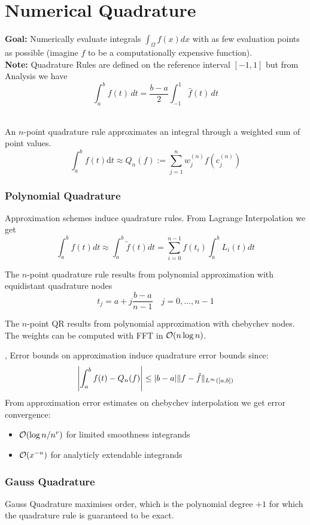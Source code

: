 \columnbreak
\part{Numerical Quadrature}
\setcounter{section}{0}

\textbf{Goal:} Numerically evaluate integrals $\int_{\Omega} f(x) dx$ with as few evaluation points as possible (imagine $f$ to be a computationally expensive function).\\

\textbf{Note:} Quadrature Rules are defined on the reference interval $[-1,1]$ but from Analysis we have
$$\int_a^b f(t) \,dt = \frac{b-a}{2} \int_{-1}^1 \hat{f}(t) \,dt$$

\\
An $n$-point quadrature rule approximates an integral through a weighted sum of point values.
$$\int_{a}^{b} f(t) \mathrm{d} t \approx Q_{n}(f):=\sum_{j=1}^{n} w_{j}^{(n)} f(c_{j}^{(n)})$$

\section{Polynomial Quadrature}

Approximation schemes induce quadrature rules. From Lagrange Interpolation we get
$$\int_{a}^{b} f(t) dt \approx  \int_{a}^{b} \tilde{f}(t) dt = \sum_{i=0}^{n-1} f(t_i) \int_{a}^{b} L_i(t) dt$$

 The $n$-point quadrature rule results from polynomial approximation with equidistant quadrature nodes
$$t_j= a+j\frac{b-a}{n-1} \quad j=0,\dots,n-1$$

 The $n$-point QR results from polynomial approximation with chebychev nodes. The weights can be computed with FFT in $\mathcal{O}(n \log n)$.

\sep
Error bounds on approximation induce quadrature error bounds since:
$$\left\lvert \int_a^b f(t) - Q_n(f) \right\rvert \leq|b-a|\|f-\tilde f\|_{L^{\infty}([a, b])}$$
 From approximation error estimates on chebychev interpolation we get error convergence:
\begin{itemize}
	\item $\mathcal{O}(\log n / n^r)$ for limited smoothness integrands
	\item $\mathcal{O}(x^{-n})$ for analyticly extendable integrands
\end{itemize}

\section{Gauss Quadrature}
Gauss Quadrature maximises order, which is the polynomial degree $+1$ for which the quadrature rule is guaranteed to be exact. \\

